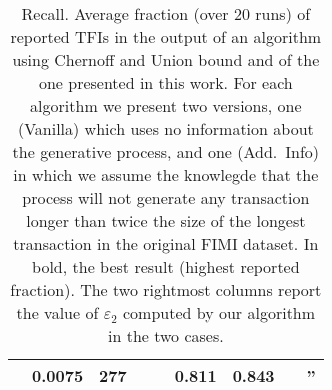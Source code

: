 \begin{table}[tbp]
\begin{tabular}{llrcccccc}
 & 0.0075 & 277 & &  & 0.811& \bf 0.843 & & ''\\
 \bottomrule
 \end{tabular}
  \caption{Recall. Average fraction (over 20 runs) of reported TFIs
  in the output of an algorithm using Chernoff and Union bound and of the one
  presented in this work. For each algorithm we present two versions, one
  (Vanilla) which uses no information about the generative process, and one
  (Add.~Info) in which we assume the knowlegde that the process will not
  generate any transaction longer than twice the size of the longest transaction
  in the original FIMI dataset. In bold, the best result (highest reported
  fraction). The two rightmost columns report the value of
  $\varepsilon_2$ computed by our algorithm in the two cases.}
\label{table:power}
\end{table}
\fi

